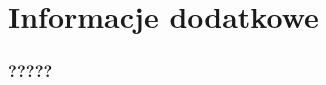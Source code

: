 \documentclass[10pt,t]{beamer}
\begin{document}











































\section{Informacje dodatkowe}









\begin{frame}
  \frametitle{?????}




\end{frame}











\end{document}
